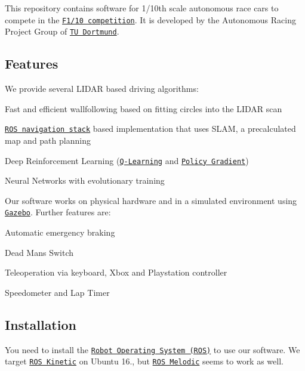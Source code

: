 \href{https://travis-ci.com/Autonomous-Racing-PG/ar-tu-do}{\tt }

This repository contains software for 1/10th scale autonomous race cars to compete in the \href{http://f1tenth.org/}{\tt F1/10 competition}. It is developed by the Autonomous Racing Project Group of \href{https://ls12-www.cs.tu-dortmund.de/daes/}{\tt TU Dortmund}.

 

\subsection*{Features}

We provide several L\+I\+D\+AR based driving algorithms\+:


\begin{DoxyItemize}
\item Fast and efficient wallfollowing based on fitting circles into the L\+I\+D\+AR scan
\item \href{http://wiki.ros.org/navigation}{\tt R\+OS navigation stack} based implementation that uses S\+L\+AM, a precalculated map and path planning
\item Deep Reinforcement Learning (\href{https://en.wikipedia.org/wiki/Q-learning}{\tt Q-\/\+Learning} and \href{https://en.wikipedia.org/wiki/Reinforcement_learning#Direct_policy_search}{\tt Policy Gradient})
\item Neural Networks with evolutionary training
\end{DoxyItemize}

Our software works on physical hardware and in a simulated environment using \href{http://gazebosim.org/}{\tt Gazebo}. Further features are\+:


\begin{DoxyItemize}
\item Automatic emergency braking
\item Dead Man\textquotesingle{}s Switch
\item Teleoperation via keyboard, Xbox and Playstation controller
\item Speedometer and Lap Timer
\end{DoxyItemize}

\subsection*{Installation}

You need to install the \href{https://www.ros.org/}{\tt Robot Operating System (R\+OS)} to use our software. We target \href{http://wiki.ros.org/kinetic/Installation}{\tt R\+OS Kinetic} on Ubuntu 16., but \href{http://wiki.ros.org/melodic/Installation}{\tt R\+OS Melodic} seems to work as well.

